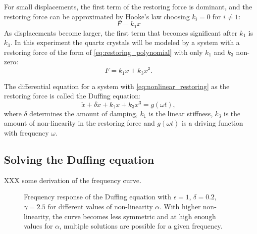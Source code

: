 For small displacements, the first term of the restoring force is dominant, and the restoring force can be approximated by Hooke's law choosing $k_i=0$ for $i\neq 1$:
\begin{equation}
F = k_1x
\end{equation}
As displacements become larger, the first term that becomes significant after $k_1$ is $k_3$. In this experiment the quartz crystals will be modeled by a system with a restoring force of the form of \autoref{eq:restoring_polynomial} with only $k_1$ and $k_3$ non-zero:
\begin{equation}\label{eq:nonlinear_restoring}
F = k_1x + k_3x^3.
\end{equation}

The differential equation for a system with \autoref{eq:nonlinear_restoring} as the restoring force is called the Duffing equation:
\begin{equation}\label{eq:duffing}
\ddot{x} + \delta \dot{x} + k_1x + k_3x^3 = g(\omega t),
\end{equation}
where $\delta$ determines the amount of damping, $k_1$ is the linear stiffness, $k_3$ is the amount of non-linearity in the restoring force and $g(\omega t)$ is a driving function with frequency $\omega$.  

\subsection{Solving the Duffing equation}
XXX some derivation of the frequency curve. 

\begin{figure}
	\centering
	\setlength\figureheight{5cm} 
	\setlength{}
	
	
	\caption{Frequency response of the Duffing equation with $\epsilon=1$, $\delta=0.2$, $\gamma=2.5$ for different values of non-linearity $\alpha$. With higher non-linearity, the curve becomes less symmetric and at high enough values for $\alpha$, multiple solutions are possible for a given frequency.}
	\label{fig:sphere}
\end{figure}




